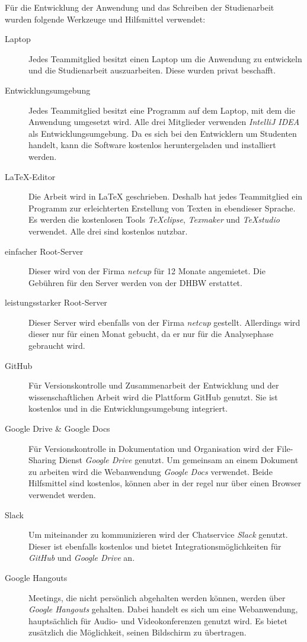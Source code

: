 \documentclass[
	pdftex,
	fontsize=12pt,          %
	DIV10,                  %
	ngerman,                %
	paper=a4,               %
	twoside=false,          %
	titlepage,              %
	parskip=half,           %
	headings=normal,        %
	listof=nochaptergap,  %
	bibliography=totoc, %
	index=totoc,            %
	captions=tableheading,  %
	final                 %
]{scrreprt}
\begin{document}
Für die Entwicklung der Anwendung und das Schreiben der Studienarbeit wurden folgende Werkzeuge und Hilfsmittel verwendet:
\begin{description}
	\item[Laptop] Jedes Teammitglied besitzt einen Laptop um die Anwendung zu entwickeln und die Studienarbeit auszuarbeiten. Diese wurden privat beschafft.
	\item[Entwicklungsumgebung] Jedes Teammitglied besitzt eine Programm auf dem Laptop, mit dem die Anwendung umgesetzt wird. Alle drei Mitglieder verwenden \textit{IntelliJ IDEA} als Entwicklungsumgebung. Da es sich bei den Entwicklern um Studenten handelt, kann die Software kostenlos heruntergeladen und installiert werden.
	\item[LaTeX-Editor] Die Arbeit wird in LaTeX geschrieben. Deshalb hat jedes Teammitglied ein Programm zur erleichterten Erstellung von Texten in ebendieser Sprache. Es werden die kostenlosen Tools \textit{TeXclipse}, \textit{Texmaker} und \textit{TeXstudio} verwendet. Alle drei sind kostenlos nutzbar.
	\item[einfacher Root-Server] Dieser wird von der Firma \textit{netcup} für 12 Monate angemietet. Die Gebühren für den Server werden von der DHBW erstattet.
	\item[leistungsstarker Root-Server] Dieser Server wird ebenfalls von der Firma \textit{netcup} gestellt. Allerdings wird dieser nur für einen Monat gebucht, da er nur für die Analysephase gebraucht wird.
	\item[GitHub] Für Versionskontrolle und Zusammenarbeit der Entwicklung und der wissenschaftlichen Arbeit wird die Plattform GitHub genutzt. Sie ist kostenlos und in die Entwicklungsumgebung integriert.
	\item[Google Drive \& Google Docs] Für Versionskontrolle in Dokumentation und Organisation wird der File-Sharing Dienst \textit{Google Drive} genutzt. Um gemeinsam an einem Dokument zu arbeiten wird die Webanwendung \textit{Google Docs} verwendet. Beide Hilfsmittel sind kostenlos, können aber in der regel nur über einen Browser verwendet werden.
	\item[Slack] Um miteinander zu kommunizieren wird der Chatservice \textit{Slack} genutzt. Dieser ist ebenfalls kostenlos und bietet Integrationsmöglichkeiten für \textit{GitHub} und \textit{Google Drive} an.
	\item[Google Hangouts] Meetings, die nicht persönlich abgehalten werden können, werden über \textit{Google Hangouts} gehalten. Dabei handelt es sich um eine Webanwendung, hauptsächlich für Audio- und Videokonferenzen genutzt wird. Es bietet zusätzlich die Möglichkeit, seinen Bildschirm zu übertragen.
\end{description}
\end{document}
